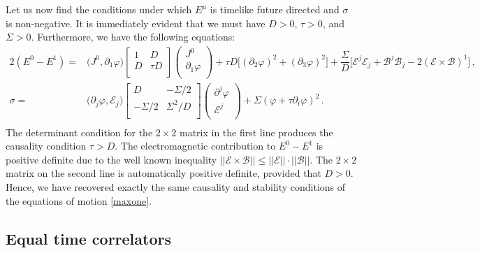 \documentclass[a4paper, amsfonts, amssymb, amsmath, reprint, showkeys, nofootinbib, twoside,notitlepage,onecolumn,preprintnumbers]{revtex4-2}
\theoremstyle{definition}
\theoremstyle{theorem}
\theoremstyle{corollary}
\begin{document}
Let us now find the conditions under which $E^\mu$ is timelike future directed and $\sigma$ is non-negative. It is immediately evident that we must have $D>0$, $\tau>0$, and $\Sigma>0$. Furthermore, we have the following equations:
\begin{equation}
\begin{split}
2(E^0-E^1) ={}&  \big( J^0, \partial_1 \varphi \big)
\begin{bmatrix}
1 & D \\
D  & \tau D \\
\end{bmatrix}
\begin{pmatrix}
J^0 \\
\partial_1 \varphi \\
\end{pmatrix} 
+  \tau D \big[ (\partial_2 \varphi)^2 {+} (\partial_3 \varphi)^2 \big] + \dfrac{\Sigma}{D} \big[ \mathcal{E}^j \mathcal{E}_j + \mathcal{B}^j \mathcal{B}_j -2(\mathcal{E} {\times} \mathcal{B})^1 \big] \, ,\\
\sigma ={}& \big(\partial_j \varphi, \mathcal{E}_j \big) \begin{bmatrix}
D & -\Sigma/2 \\
-\Sigma/2 & \Sigma^2/D \\
\end{bmatrix}
\begin{pmatrix}
\partial^j \varphi \\ 
\mathcal{E}^j \\
\end{pmatrix}+ \Sigma (\varphi+\tau \partial_t \varphi)^2  \, . \\
\end{split}
\end{equation}
The determinant condition for the $2\times 2$ matrix in the first line produces the causality condition $\tau>D$. The electromagnetic contribution to $E^0-E^1$ is positive definite due to the well known inequality $||\mathcal{E} {\times} \mathcal{B} || \leq ||\mathcal{E}|| {\cdot} || \mathcal{B} || $. The $2 \times 2$ matrix on the second line is automatically positive definite, provided that $D>0$. Hence, we have recovered exactly the same causality and stability conditions of the equations of motion \eqref{maxone}.


\subsection{Equal time correlators}
\end{document}
